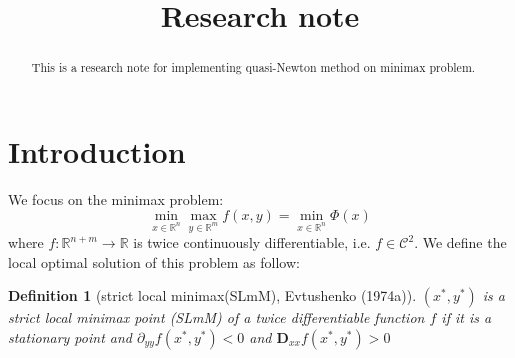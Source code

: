 \documentclass{article}
\title{Research note}
\newtheorem{definition}{Definition}
\begin{document}
\maketitle

\begin{abstract}
This is a research note for implementing quasi-Newton method on minimax problem.
\end{abstract}

\section{Introduction}
We focus on the minimax problem:
\begin{equation}
    \min_{x \in \mathbb{R}^n} \max_{y \in \mathbb{R}^m} f(x,y) = \min_{x \in \mathbb{R}^n} \Phi(x)
\end{equation}
where $f: \mathbb{R}^{n+m} \to \mathbb{R}$ is twice continuously differentiable, i.e. $f \in \mathcal{C}^2$.
We define the local optimal solution of this problem as follow:

\begin{definition}[strict local minimax(SLmM), Evtushenko (1974a)] $(x^*, y^*)$ is a strict local minimax point (SLmM) of a twice differentiable function $f$ if it is a stationary point and $\partial_{yy}f(x^*,y^*) < 0$ and $\mathbf{D}_{xx}f(x^*,y^*) > 0$
    
\end{definition}
\end{document}
